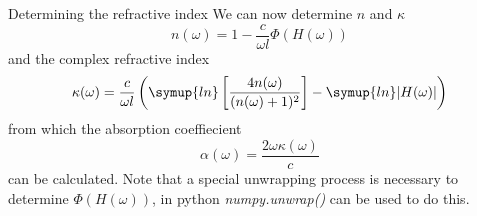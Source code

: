 \documentclass[aspectratio=1610, 9pt]{beamer}
\begin{document}
\begin{frame}{Determining the refractive index}
  We can now determine $n$ and $\kappa$
  \begin{equation}
    n(\omega) = 1 - \frac{c}{\omega l} \Phi(H(\omega))
  \end{equation}
  and the complex refractive index 
  \begin{equation}
    \kappa(\omega) = \frac{c}{\omega l } \left( \symup{ln}\left[ \frac{4 n(\omega)}{(n(\omega) + 1)^2}\right] - \symup{ln}|H(\omega)|\right)
  \end{equation}
  from which the absorption coeffiecient
  \begin{equation}
    \alpha(\omega) = \frac{2 \omega \kappa(\omega)}{c}
  \end{equation}
  can be calculated.
  Note that a special unwrapping process is necessary to determine $\Phi(H(\omega))$, in python \textit{numpy.unwrap()} can be used to do this.
\end{frame}
\end{document}
